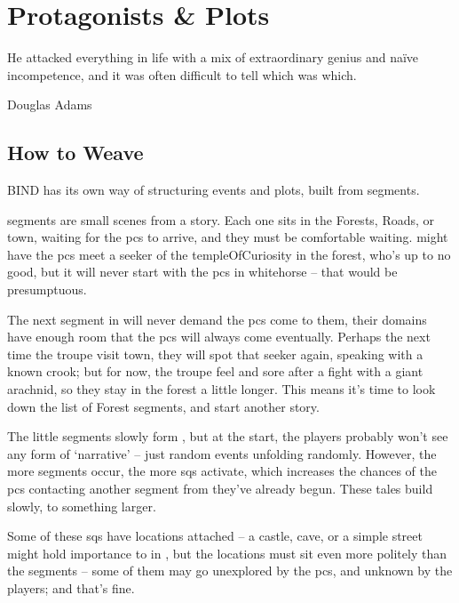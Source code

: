 \chapter{Protagonists \& Plots}
  \epigraph{He attacked everything in life with a mix of extraordinary genius and na\"ive incompetence, and it was often difficult to tell which was which.}{Douglas Adams}
\label{sideQuestIntro}

\section{How to Weave}
\label{sqSummaries}

\begin{multicols}{2}

\noindent
BIND has its own way of structuring events and plots, built from \glspl{segment}.

\Glspl{segment} are small scenes from a story.
Each one sits in the Forests, Roads, or \gls{town}, waiting for the \glspl{pc} to arrive, and they must be comfortable waiting.
 might have the \glspl{pc} meet a \gls{seeker} of the \gls{templeOfCuriosity} in the forest, who's up to no good, but it will never start with the \glspl{pc} in \gls{whitehorse} -- that would be presumptuous.

The next \gls{segment} in  will never demand the \glspl{pc} come to them, their domains have enough room that the \glspl{pc} will always come eventually.
Perhaps the next time the troupe visit town, they will spot that \gls{seeker} again, speaking with a known crook; but for now, the troupe feel and sore after a fight with a giant arachnid, so they stay in the forest a little longer.
This means it's time to look down the list of Forest \glspl{segment}, and start another story.

The little \glspl{segment} slowly form , but at the start, the players probably won't see any form of `narrative' -- just random events unfolding randomly.
However, the more \glspl{segment} occur, the more \glspl{sq} activate, which increases the chances of the \glspl{pc} contacting another \gls{segment} from  they've already begun.
These tales build slowly, to something larger.

Some of these \glspl{sq} have locations attached -- a castle, cave, or a simple street might hold importance to  in , but the locations must sit even more politely than the \glspl{segment} -- some of them may go unexplored by the \glspl{pc}, and unknown by the players; and that's fine.


\end{multicols}
